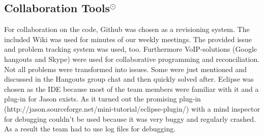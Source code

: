\subsection{Collaboration Tools$^\odot$}
For collaboration on the code, Github was chosen as a revisioning system. The included Wiki was used for minutes of our weekly meetings. The provided issue and problem tracking system was used, too. Furthermore VoIP-solutions (Google hangouts and Skype) were used for collaborative programming and reconciliation. Not all problems were transformed into issues. Some were just mentioned and discussed in the Hangouts group chat and then quickly solved after. Eclipse was chosen as the IDE because most of the team members were familiar with it and a plug-in for Jason exists. As it turned out the promising plug-in (http://jason.sourceforge.net/mini-tutorial/eclipse-plugin/) with a mind inspector for debugging couldn't be used because it was very buggy and regularly crashed. As a result the team had to use log files for debugging. 

